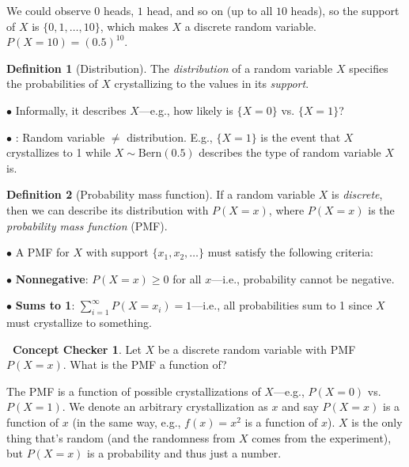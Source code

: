 \documentclass[12pt,oneside]{article}
\newcommand{\Bern}{\text{Bern}}
\newcommand{\warning}{\textbf{\Biohazard}: }
\theoremstyle{definition}
\newtheorem{definition}{Definition}
\newtheorem{concept}{\faPen \ Concept Checker}
\theoremstyle{remark}
\begin{document}
\begin{solutionbox}
We could observe $0$ heads, $1$ head, and so on (up to all $10$ heads), so the support of $X$ is $\{0, 1, \ldots, 10\}$, which makes $X$ a discrete random variable. $P(X = 10) = (0.5)^{10}$.
\end{solutionbox}

\begin{definition}[Distribution]
The \textit{distribution} of a random variable $X$ specifies the probabilities of $X$ crystallizing to the values in its \textit{support}.

$\bullet$ Informally, it describes $X$—e.g., how likely is $\{X = 0\}$ vs. $\{X = 1\}$?

$\bullet$ \warning Random variable $\neq$ distribution. E.g., $\{X = 1\}$ is the event that $X$ crystallizes to 1 while $X \sim \Bern(0.5)$ describes the type of random variable $X$ is. 
\end{definition}

\begin{definition}[Probability mass function]
If a random variable $X$ is \textit{discrete}, then we can describe its distribution with $P(X = x)$, where $P(X = x)$ is the \textit{probability mass function} (PMF).

$\bullet$ A PMF for $X$ with support $\{x_1, x_2, \ldots\}$ must satisfy the following criteria:

$\bullet$ \textbf{Nonnegative}: $P(X = x) \geq 0$ for all $x$—i.e., probability cannot be negative.

$\bullet$ \textbf{Sums to 1}: $\sum_{i = 1}^{\infty} P(X = x_i) = 1$—i.e., all probabilities sum to 1 since $X$ must crystallize to something.
\end{definition}

\begin{concept}
Let $X$ be a discrete random variable with PMF $P(X = x)$. What is the PMF a function of?
\end{concept}

\begin{solutionbox}
The PMF is a function of possible crystallizations of $X$—e.g., $P(X = 0)$ vs. $P(X = 1)$. We denote an arbitrary crystallization as $x$ and say $P(X = x)$ is a function of $x$ (in the same way, e.g., $f(x) = x^2$ is a function of $x$). $X$ is the only thing that's random (and the randomness from $X$ comes from the experiment), but $P(X = x)$ is a probability and thus just a number.
\end{solutionbox}
\end{document}
